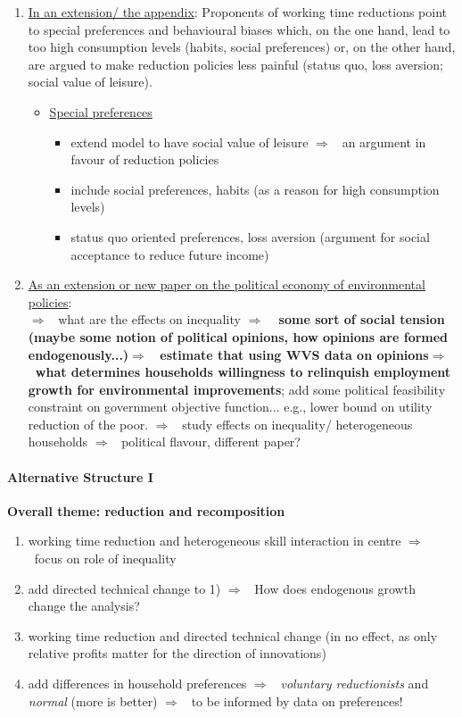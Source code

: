 \documentclass[12pt]{article}
\newcommand{\ar}{$\Rightarrow$ \ }
\begin{document}
\begin{enumerate}
\item  \underline{In an extension/ the appendix}:
Proponents of working time reductions point to special preferences and behavioural biases which, on the one hand, lead to too high consumption levels (habits, social preferences) or, on the other hand, are argued to make reduction policies less painful (status quo, loss aversion; social value of leisure). 
\begin{itemize}
	\item \underline{Special preferences}
	\begin{itemize}
		\item extend model to have social value of leisure \ar an argument in favour of reduction policies \citep{Alesina2005WorkDifferent}
		\item include social preferences, habits (as a reason for high consumption levels) \citep{Arrow2004AreMuch, Alvarez-Cuadrado2007EnvyHours, Ravn2006DeepHabits}
		\item status quo oriented preferences, loss aversion \citep{Schor2005SustainableReduction} (argument for social acceptance to reduce future income)
	\end{itemize}
\end{itemize}

\item \underline{As an extension or new paper on the political economy of environmental policies}: \\
\ar what are the effects on inequality \ar \textbf{ some sort of social tension (maybe some notion of political opinions, how opinions are formed endogenously...)\ar estimate that using WVS data on opinions\ar what determines households willingness to relinquish employment growth for environmental improvements}; 
 add some political feasibility constraint on government objective function... e.g., lower bound on utility reduction of the poor. \ar study effects on inequality/ heterogeneous households \ar political flavour, different paper?

\end{enumerate}

\paragraph{Alternative Structure I}
\textbf{Overall theme: reduction and recomposition}

\begin{enumerate}
\item working time reduction and heterogeneous skill interaction in centre \ar focus on role of inequality
\item add directed technical change to 1) \ar How does endogenous growth change the analysis? 
\item working time reduction and directed technical change (in \cite{Acemoglu2012TheChange} no effect, as only relative profits matter for the direction of innovations)
\item add differences in household preferences \ar \textit{voluntary reductionists} and \textit{normal} (more is better) \ar to be informed by data on preferences!
\end{enumerate}
\end{document}
